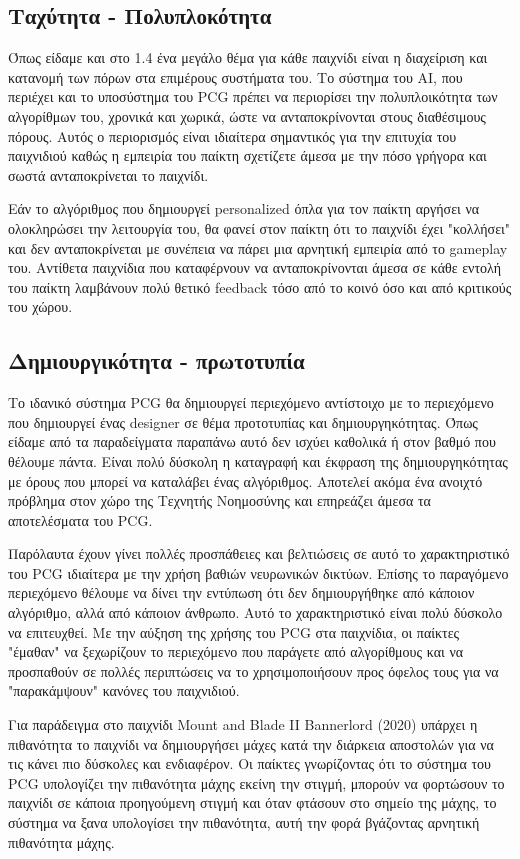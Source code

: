 \subsection{Ταχύτητα - Πολυπλοκότητα} Όπως είδαμε και στο 1.4 ένα μεγάλο θέμα για κάθε παιχνίδι είναι η διαχείριση και κατανομή των πόρων στα επιμέρους συστήματα του. Το σύστημα του AI, που περιέχει και το υποσύστημα του PCG πρέπει να περιορίσει την πολυπλοικότητα των αλγορίθμων του, χρονικά και χωρικά, ώστε να ανταποκρίνονται στους διαθέσιμους πόρους. Αυτός ο περιορισμός είναι ιδιαίτερα σημαντικός για την επιτυχία του παιχνιδιού καθώς η εμπειρία του παίκτη σχετίζετε άμεσα με την πόσο γρήγορα και σωστά ανταποκρίνεται το παιχνίδι. 
\par
Εάν το αλγόριθμος που δημιουργεί personalized όπλα για τον παίκτη αργήσει να ολοκληρώσει την λειτουργία του, θα φανεί στον παίκτη ότι το παιχνίδι έχει "κολλήσει" και δεν ανταποκρίνεται με συνέπεια να πάρει μια αρνητική εμπειρία από το gameplay του. Αντίθετα παιχνίδια που καταφέρνουν να ανταποκρίνονται άμεσα σε κάθε εντολή του παίκτη λαμβάνουν πολύ θετικό feedback τόσο από το κοινό όσο και από κριτικούς του χώρου.

\subsection{Δημιουργικότητα - πρωτοτυπία} Το ιδανικό σύστημα PCG θα δημιουργεί περιεχόμενο αντίστοιχο με το περιεχόμενο που δημιουργεί ένας designer σε θέμα προτοτυπίας και δημιουργηκότητας. Όπως είδαμε από τα παραδείγματα παραπάνω αυτό δεν ισχύει καθολικά ή στον βαθμό που θέλουμε πάντα. Είναι πολύ δύσκολη η καταγραφή και έκφραση της δημιουργηκότητας με όρους που μπορεί να καταλάβει ένας αλγόριθμος. Αποτελεί ακόμα ένα ανοιχτό πρόβλημα στον χώρο της Τεχνητής Νοημοσύνης και επηρεάζει άμεσα τα αποτελέσματα του PCG.
\par
Παρόλαυτα έχουν γίνει πολλές προσπάθειες και βελτιώσεις σε αυτό το χαρακτηριστικό του PCG ιδιαίτερα με την χρήση βαθιών νευρωνικών δικτύων. Επίσης το παραγόμενο περιεχόμενο θέλουμε να δίνει την εντύπωση ότι δεν δημιουργήθηκε από κάποιον αλγόριθμο, αλλά από κάποιον άνθρωπο. Αυτό το χαρακτηριστικό είναι πολύ δύσκολο να επιτευχθεί. Με την αύξηση της χρήσης του PCG στα παιχνίδια, οι παίκτες "έμαθαν" να ξεχωρίζουν το περιεχόμενο που παράγετε από αλγορίθμους και να προσπαθούν σε πολλές περιπτώσεις να το χρησιμοποιήσουν προς όφελος τους για να "παρακάμψουν" κανόνες του παιχνιδιού.
\par
Για παράδειγμα στο παιχνίδι Mount and Blade II Bannerlord (2020) υπάρχει η πιθανότητα το παιχνίδι να δημιουργήσει μάχες κατά την διάρκεια αποστολών για να τις κάνει πιο δύσκολες και ενδιαφέρον. Οι παίκτες γνωρίζοντας ότι το σύστημα του PCG υπολογίζει την πιθανότητα μάχης εκείνη την στιγμή, μπορούν να φορτώσουν το παιχνίδι σε κάποια προηγούμενη στιγμή και όταν φτάσουν στο σημείο της μάχης, το σύστημα να ξανα υπολογίσει την πιθανότητα, αυτή την φορά βγάζοντας αρνητική πιθανότητα μάχης. 

